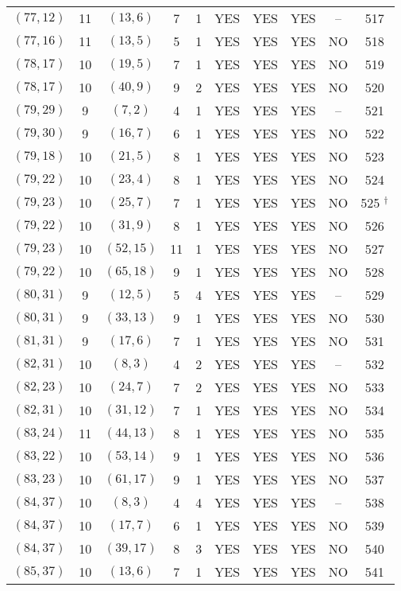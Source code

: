 \begin{longtable}{|c|c|c|c|c|c|c|c|c|c|}
$(77, 12)$ & 11 & $(13, 6)$ & 7 & 1 & YES & YES & YES & -- & 517\\
$(77, 16)$ & 11 & $(13, 5)$ & 5 & 1 & YES & YES & YES & NO & 518\\
$(78, 17)$ & 10 & $(19, 5)$ & 7 & 1 & YES & YES & YES & NO & 519\\
$(78, 17)$ & 10 & $(40, 9)$ & 9 & 2 & YES & YES & YES & NO & 520\\
$(79, 29)$ & 9 & $(7, 2)$ & 4 & 1 & YES & YES & YES & -- & 521\\
$(79, 30)$ & 9 & $(16, 7)$ & 6 & 1 & YES & YES & YES & NO & 522\\
$(79, 18)$ & 10 & $(21, 5)$ & 8 & 1 & YES & YES & YES & NO & 523\\
$(79, 22)$ & 10 & $(23, 4)$ & 8 & 1 & YES & YES & YES & NO & 524\\
$(79, 23)$ & 10 & $(25, 7)$ & 7 & 1 & YES & YES & YES & NO & 525 ${}^\dagger$\\
$(79, 22)$ & 10 & $(31, 9)$ & 8 & 1 & YES & YES & YES & NO & 526\\
$(79, 23)$ & 10 & $(52, 15)$ & 11 & 1 & YES & YES & YES & NO & 527\\
$(79, 22)$ & 10 & $(65, 18)$ & 9 & 1 & YES & YES & YES & NO & 528\\
$(80, 31)$ & 9 & $(12, 5)$ & 5 & 4 & YES & YES & YES & -- & 529\\
$(80, 31)$ & 9 & $(33, 13)$ & 9 & 1 & YES & YES & YES & NO & 530\\
$(81, 31)$ & 9 & $(17, 6)$ & 7 & 1 & YES & YES & YES & NO & 531\\
$(82, 31)$ & 10 & $(8, 3)$ & 4 & 2 & YES & YES & YES & -- & 532\\
$(82, 23)$ & 10 & $(24, 7)$ & 7 & 2 & YES & YES & YES & NO & 533\\
$(82, 31)$ & 10 & $(31, 12)$ & 7 & 1 & YES & YES & YES & NO & 534\\
$(83, 24)$ & 11 & $(44, 13)$ & 8 & 1 & YES & YES & YES & NO & 535\\
$(83, 22)$ & 10 & $(53, 14)$ & 9 & 1 & YES & YES & YES & NO & 536\\
$(83, 23)$ & 10 & $(61, 17)$ & 9 & 1 & YES & YES & YES & NO & 537\\
$(84, 37)$ & 10 & $(8, 3)$ & 4 & 4 & YES & YES & YES & -- & 538\\
$(84, 37)$ & 10 & $(17, 7)$ & 6 & 1 & YES & YES & YES & NO & 539\\
$(84, 37)$ & 10 & $(39, 17)$ & 8 & 3 & YES & YES & YES & NO & 540\\
$(85, 37)$ & 10 & $(13, 6)$ & 7 & 1 & YES & YES & YES & NO & 541\\

\end{longtable}
